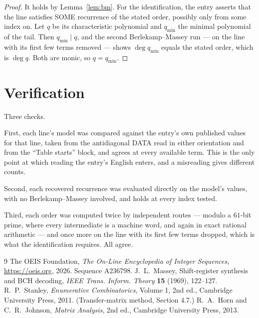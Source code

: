 \documentclass[11pt,a4paper]{article}
\theoremstyle{plain}
\theoremstyle{definition}
\begin{document}
\begin{proof}
It holds by Lemma~\ref{lem:bm}. For the identification, the entry asserts that the line
satisfies SOME recurrence of the stated order, possibly only from some index on. Let $q$ be its
characteristic polynomial and $q_{\min}$ the minimal polynomial of the tail. Then
$q_{\min}\mid q$, and the second Berlekamp--Massey run --- on the line with its first few
terms removed --- shows $\deg q_{\min}$ equals the stated order, which is $\deg q$. Both are
monic, so $q=q_{\min}$.
\end{proof}

\section{Verification}

Three checks.

First, each line's model was compared against the entry's own published values for that line,
taken from the antidiagonal DATA read in either orientation and from the ``Table starts''
block, and agrees at every available term. This is the only point at which reading the entry's
English enters, and a misreading gives different counts.

Second, each recovered recurrence was evaluated directly on the model's values, with no
Berlekamp--Massey involved, and holds at every index tested.

Third, each order was computed twice by independent routes --- modulo a $61$-bit prime, where
every intermediate is a machine word, and again in exact rational arithmetic --- and once more
on the line with its first few terms dropped, which is what the identification requires. All
agree.

\begin{thebibliography}{9}
 The OEIS Foundation, \emph{The On-Line Encyclopedia of Integer
Sequences}, \url{https://oeis.org}, 2026. Sequence A236798.
 J.~L.~Massey, Shift-register synthesis and BCH decoding, \emph{IEEE
Trans. Inform. Theory} \textbf{15} (1969), 122--127.
 R.~P.~Stanley, \emph{Enumerative Combinatorics}, Volume 1, 2nd ed.,
Cambridge University Press, 2011. (Transfer-matrix method, Section 4.7.)
 R.~A.~Horn and C.~R.~Johnson, \emph{Matrix Analysis}, 2nd ed., Cambridge
University Press, 2013.
\end{thebibliography}
\end{document}
